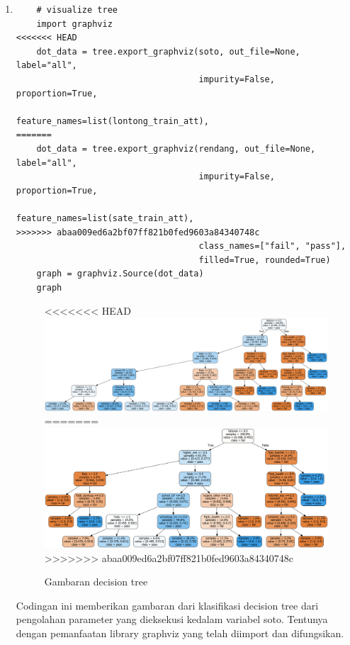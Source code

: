 \begin{enumerate}
\item
\begin{verbatim}
	# visualize tree
	import graphviz
<<<<<<< HEAD
	dot_data = tree.export_graphviz(soto, out_file=None, label="all", 
									impurity=False, proportion=True,
	                                feature_names=list(lontong_train_att), 
=======
	dot_data = tree.export_graphviz(rendang, out_file=None, label="all", 
									impurity=False, proportion=True,
	                                feature_names=list(sate_train_att), 
>>>>>>> abaa009ed6a2bf07ff821b0fed9603a84340748c
									class_names=["fail", "pass"], 
	                                filled=True, rounded=True)
	graph = graphviz.Source(dot_data)
	graph
\end{verbatim}
\begin{figure}[ht]
\centering
<<<<<<< HEAD
\includegraphics[scale=0.3]{figures/lontong/6.png}
=======
\includegraphics[scale=0.3]{figures/45.png}
>>>>>>> abaa009ed6a2bf07ff821b0fed9603a84340748c
\caption{Gambaran decision tree}
\end{figure}
\par
	Codingan ini memberikan gambaran dari klasifikasi decision tree dari pengolahan parameter yang dieksekusi kedalam variabel soto. Tentunya dengan pemanfaatan library graphviz yang telah diimport dan difungsikan.


\end{enumerate}
